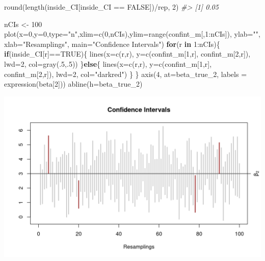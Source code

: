 \documentclass[
  14pt,
]{memoir}
\newenvironment{Shaded}{\begin{snugshade}}{\end{snugshade}}
\newcommand{\AttributeTok}[1]{\textcolor[rgb]{0.77,0.63,0.00}{#1}}
\newcommand{\CommentTok}[1]{\textcolor[rgb]{0.56,0.35,0.01}{\textit{#1}}}
\newcommand{\ConstantTok}[1]{\textcolor[rgb]{0.00,0.00,0.00}{#1}}
\newcommand{\ControlFlowTok}[1]{\textcolor[rgb]{0.13,0.29,0.53}{\textbf{#1}}}
\newcommand{\DecValTok}[1]{\textcolor[rgb]{0.00,0.00,0.81}{#1}}
\newcommand{\FunctionTok}[1]{\textcolor[rgb]{0.00,0.00,0.00}{#1}}
\newcommand{\NormalTok}[1]{#1}
\newcommand{\OtherTok}[1]{\textcolor[rgb]{0.56,0.35,0.01}{#1}}
\newcommand{\SpecialCharTok}[1]{\textcolor[rgb]{0.00,0.00,0.00}{#1}}
\newcommand{\StringTok}[1]{\textcolor[rgb]{0.31,0.60,0.02}{#1}}
\begin{document}
\begin{Shaded}
\begin{Highlighting}[]
\FunctionTok{round}\NormalTok{(}\FunctionTok{length}\NormalTok{(inside\_CI[inside\_CI }\SpecialCharTok{==} \ConstantTok{FALSE}\NormalTok{])}\SpecialCharTok{/}\NormalTok{rep, }\DecValTok{2}\NormalTok{)}
\CommentTok{\#\textgreater{} [1] 0.05}

\NormalTok{nCIs }\OtherTok{\textless{}{-}} \DecValTok{100}
\FunctionTok{plot}\NormalTok{(}\AttributeTok{x=}\DecValTok{0}\NormalTok{,}\AttributeTok{y=}\DecValTok{0}\NormalTok{,}\AttributeTok{type=}\StringTok{"n"}\NormalTok{,}\AttributeTok{xlim=}\FunctionTok{c}\NormalTok{(}\DecValTok{0}\NormalTok{,nCIs),}\AttributeTok{ylim=}\FunctionTok{range}\NormalTok{(confint\_m[,}\DecValTok{1}\SpecialCharTok{:}\NormalTok{nCIs]),}
     \AttributeTok{ylab=}\StringTok{""}\NormalTok{, }\AttributeTok{xlab=}\StringTok{"Resamplings"}\NormalTok{, }\AttributeTok{main=}\StringTok{"Confidence Intervals"}\NormalTok{)}
\ControlFlowTok{for}\NormalTok{(r }\ControlFlowTok{in} \DecValTok{1}\SpecialCharTok{:}\NormalTok{nCIs)\{}
  \ControlFlowTok{if}\NormalTok{(inside\_CI[r]}\SpecialCharTok{==}\ConstantTok{TRUE}\NormalTok{)\{}
      \FunctionTok{lines}\NormalTok{(}\AttributeTok{x=}\FunctionTok{c}\NormalTok{(r,r), }\AttributeTok{y=}\FunctionTok{c}\NormalTok{(confint\_m[}\DecValTok{1}\NormalTok{,r], confint\_m[}\DecValTok{2}\NormalTok{,r]), }
            \AttributeTok{lwd=}\DecValTok{2}\NormalTok{, }\AttributeTok{col=}\FunctionTok{gray}\NormalTok{(.}\DecValTok{5}\NormalTok{,.}\DecValTok{5}\NormalTok{))}
\NormalTok{  \}}\ControlFlowTok{else}\NormalTok{\{}
      \FunctionTok{lines}\NormalTok{(}\AttributeTok{x=}\FunctionTok{c}\NormalTok{(r,r), }\AttributeTok{y=}\FunctionTok{c}\NormalTok{(confint\_m[}\DecValTok{1}\NormalTok{,r], confint\_m[}\DecValTok{2}\NormalTok{,r]), }
            \AttributeTok{lwd=}\DecValTok{2}\NormalTok{, }\AttributeTok{col=}\StringTok{"darkred"}\NormalTok{)}
\NormalTok{    \}}
\NormalTok{\}}
\FunctionTok{axis}\NormalTok{(}\DecValTok{4}\NormalTok{, }\AttributeTok{at=}\NormalTok{beta\_true\_2, }\AttributeTok{labels =} \FunctionTok{expression}\NormalTok{(beta[}\DecValTok{2}\NormalTok{]))}
\FunctionTok{abline}\NormalTok{(}\AttributeTok{h=}\NormalTok{beta\_true\_2)}
\end{Highlighting}
\end{Shaded}

\begin{center}\includegraphics[width=1\textwidth]{figure/minimal-unnamed-chunk-79-1} \end{center}
\end{document}
